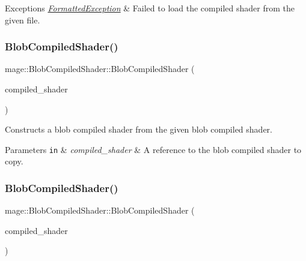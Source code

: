 \begin{DoxyExceptions}{Exceptions}
{\em \hyperlink{structmage_1_1_formatted_exception}{Formatted\+Exception}} & Failed to load the compiled shader from the given file. \\
\hline
\end{DoxyExceptions}
\hypertarget{structmage_1_1_blob_compiled_shader_af7001d0e9c9a95f7ac9b9cc009bc1e94}{}\label{structmage_1_1_blob_compiled_shader_af7001d0e9c9a95f7ac9b9cc009bc1e94} 
\subsubsection{\texorpdfstring{Blob\+Compiled\+Shader()}{BlobCompiledShader()}\hspace{0.1cm}{\footnotesize\ttfamily [2/3]}}
{\footnotesize\ttfamily mage\+::\+Blob\+Compiled\+Shader\+::\+Blob\+Compiled\+Shader (\begin{DoxyParamCaption}\item[{const \hyperlink{structmage_1_1_blob_compiled_shader}{Blob\+Compiled\+Shader} \&}]{compiled\+\_\+shader }\end{DoxyParamCaption})\hspace{0.3cm}{\ttfamily [default]}}

Constructs a blob compiled shader from the given blob compiled shader.


\begin{DoxyParams}[1]{Parameters}
\mbox{\tt in}  & {\em compiled\+\_\+shader} & A reference to the blob compiled shader to copy. \\
\hline
\end{DoxyParams}
\hypertarget{structmage_1_1_blob_compiled_shader_a41e4b17557dd1d6172fd6afcb97fdd79}{}\label{structmage_1_1_blob_compiled_shader_a41e4b17557dd1d6172fd6afcb97fdd79} 
\subsubsection{\texorpdfstring{Blob\+Compiled\+Shader()}{BlobCompiledShader()}\hspace{0.1cm}{\footnotesize\ttfamily [3/3]}}
{\footnotesize\ttfamily mage\+::\+Blob\+Compiled\+Shader\+::\+Blob\+Compiled\+Shader (\begin{DoxyParamCaption}\item[{\hyperlink{structmage_1_1_blob_compiled_shader}{Blob\+Compiled\+Shader} \&\&}]{compiled\+\_\+shader }\end{DoxyParamCaption})\hspace{0.3cm}{\ttfamily [default]}}

